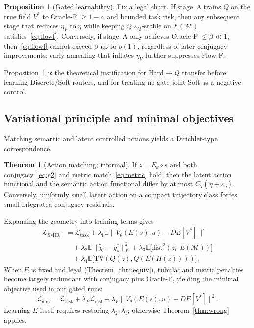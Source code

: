 \documentclass[letterpaper,10pt,twocolumn]{article}
\theoremstyle{definition}
\newtheorem{theorem}{Theorem}
\newtheorem{proposition}{Proposition}
\newcommand{\TV}{\mathrm{TV}}
\newcommand{\EE}{\mathbb{E}}
\newcommand{\cM}{\mathcal{M}}
\begin{document}
\begin{proposition}[Gated learnability]
\label{prop:gate}
Fix a legal chart.
If stage~A trains $Q$ on the true field $V^*$ to Oracle-F $\ge 1-\alpha$ and bounded task risk, then any subsequent stage that reduces $\eta_V$ to $\eta$ while keeping $Q$ $\varepsilon_Q$-stable on $E(\cM)$ satisfies~\eqref{eq:flowf}.
Conversely, if stage~A only achieves Oracle-F $\le\beta\ll 1$, then~\eqref{eq:flowf} cannot exceed $\beta$ up to $o(1)$, regardless of later conjugacy improvements; early annealing that inflates $\eta_V$ further suppresses Flow-F.
\end{proposition}
Proposition~\ref{prop:gate} is the theoretical justification for Hard$\to Q$ transfer before learning Discrete/Soft routers, and for treating no-gate joint Soft as a negative control.

\subsection{Variational principle and minimal objectives}
Matching semantic and latent controlled actions yields a Dirichlet-type correspondence.
\begin{theorem}[Action matching; informal]
\label{thm:var}
If $z=E_\theta\circ s$ and both conjugacy~\eqref{eq:g2} and metric match~\eqref{eq:metric} hold, then the latent action functional and the semantic action functional differ by at most $C_T(\eta+\varepsilon_g)$.
Conversely, uniformly small latent action on a compact trajectory class forces small integrated conjugacy residuals.
\end{theorem}
Expanding the geometry into training terms gives
\begin{equation}
\begin{aligned}
\mathcal{L}_{\mathrm{SMIR}}
&=
\mathcal{L}_{\mathrm{task}}
+\lambda_1\EE\|V_\theta(E(s),u)-DE[V^*]\|^2
\\
&\quad
+\lambda_2\EE\|\tilde g_s-g^*_s\|_F^2
+\lambda_3\EE\big[\mathrm{dist}^2(z_t,E(\cM))\big]
\\
&\quad
+\lambda_4\EE\big[\TV(Q(z),Q(E(\Pi(z))))\big].
\end{aligned}
\label{eq:lfull}
\end{equation}
When $E$ is fixed and legal (Theorem~\ref{thm:equiv}), tubular and metric penalties become largely redundant with conjugacy plus Oracle-F, yielding the minimal objective used in our gated runs:
\begin{equation}
\mathcal{L}_{\min}
=
\mathcal{L}_{\mathrm{task}}
+\lambda_F\mathcal{L}_{\mathrm{dist}}
+\lambda_V\|V_\theta(E(s),u)-DE[V^*]\|^2.
\label{eq:lmin}
\end{equation}
Learning $E$ itself requires restoring $\lambda_2,\lambda_3$; otherwise Theorem~\ref{thm:wrong} applies.
\end{document}
